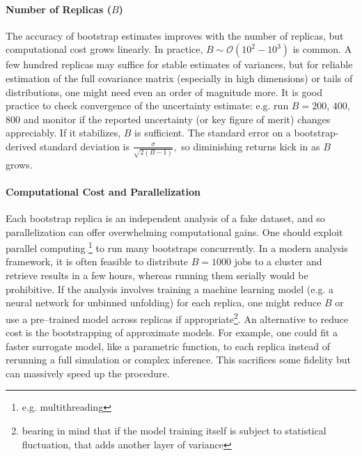         \paragraph{Number of Replicas ($B$)}
            The accuracy of bootstrap estimates improves with the number of replicas, but computational cost grows linearly.
            In practice, $B\sim{\mathcal O}(10^2 - 10^3)$ is common.
            A few hundred replicas may suffice for stable estimates of variances, but for reliable estimation of the full covariance matrix (especially in high dimensions) or tails of distributions, one might need even an order of magnitude more.
            It is good practice to check convergence of the uncertainty estimate: e.g. run $B=200$, $400$, $800$ and monitor if the reported uncertainty (or key figure of merit) changes appreciably.
            If it stabilizes, $B$ is sufficient.
            The standard error on a bootstrap-derived standard deviation is $\frac{\sigma}{\sqrt{2(B-1)}},$ so diminishing returns kick in as $B$ grows.
        \paragraph{Computational Cost and Parallelization}
            Each bootstrap replica is an independent analysis of a fake dataset, and so parallelization can offer overwhelming computational gains.
            One should exploit parallel computing \footnote{e.g. multithreading} to run many bootstraps concurrently.
            In a modern analysis framework, it is often feasible to distribute $B=1000$ jobs to a cluster and retrieve results in a few hours, whereas running them serially would be prohibitive.
            If the analysis involves training a machine learning model (e.g. a neural network for unbinned unfolding) for each replica, one might reduce $B$ or use a pre--trained model across replicas if appropriate\footnote{bearing in mind that if the model training itself is subject to statistical fluctuation, that adds another layer of variance}.
            An alternative to reduce cost is the bootstrapping of approximate models.
            For example, one could fit a faster surrogate model, like a parametric function, to each replica instead of rerunning a full simulation or complex inference.
            This sacrifices some fidelity but can massively speed up the procedure.
